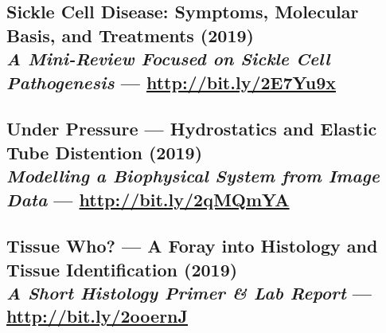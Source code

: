 \documentclass[twocolumn, a4paper, fontsize=9pt, headsepline, footsepline]{scrartcl}
\begin{document}
\subsection*{Sickle Cell Disease: Symptoms, Molecular Basis, and Treatments
(2019)\\\vspace{-2pt}\hspace{14.22636pt}\textmd{\emph{A Mini-Review Focused on Sickle Cell
    Pathogenesis} — \url{http://bit.ly/2E7Yu9x}}}


\subsection*{Under Pressure — Hydrostatics and Elastic Tube Distention
  (2019)\\\vspace{-2pt}\hspace{14.22636pt}\textmd{\emph{Modelling a Biophysical System from
    Image Data} — \url{http://bit.ly/2qMQmYA}}}


\subsection*{Tissue Who? — A Foray into Histology and Tissue Identification
  (2019)\\\vspace{-2pt}\hspace{14.22636pt}\textmd{\emph{A Short Histology Primer \& Lab
    Report} — \url{http://bit.ly/2ooernJ}}}
\end{document}
